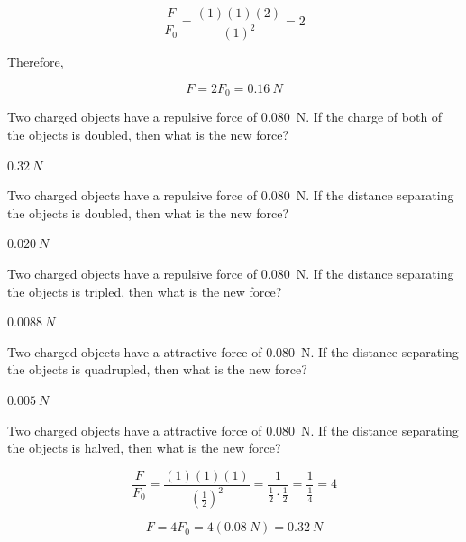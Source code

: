 \documentclass[answers]{exam}
\begin{document}
\begin{questions}
\begin{solution}
\begin{equation*}
    \frac{F}{F_0} = \frac{(1)(1)(2)}{(1)^2} = 2
\end{equation*}

Therefore,

\begin{equation*}
    F = 2F_0 = \boxed{\SI{0.16}{N}}
\end{equation*}

\end{solution}



\question
Two charged objects have a repulsive force of \SI{0.080}{N}. If the charge of both of the objects is doubled, then what is the new force?

\begin{solution}
$\SI{0.32}{N}$
\end{solution}

\question
Two charged objects have a repulsive force of \SI{0.080}{N}. If the distance separating the objects is doubled, then what is the new force?

\begin{solution}
$\SI{0.020}{N}$
\end{solution}

\question
Two charged objects have a repulsive force of \SI{0.080}{N}. If the distance separating the objects is tripled, then what is the new force?

\begin{solution}
$\SI{0.0088}{N}$
\end{solution}


\question
Two charged objects have a attractive force of \SI{0.080}{N}. If the distance separating the objects is quadrupled, then what is the new force?

\begin{solution}
$\SI{0.005}{N}$
\end{solution}

\question
Two charged objects have a attractive force of \SI{0.080}{N}. If the distance separating the objects is halved, then what is the new force?

\begin{solution}
\begin{equation*}
    \frac{F}{F_0} = \frac{(1)(1)(1)}{\left(\frac{1}{2}\right)^2} = \frac{1}{\frac{1}{2}\cdot\frac{1}{2}} = \frac{1}{\frac{1}{4}} = 4
\end{equation*}

\begin{equation*}
    F = 4 F_0 = 4(\SI{0.08}{N}) = \boxed{\SI{0.32}{N}}
\end{equation*}
\end{solution}


\end{questions}
\end{document}
